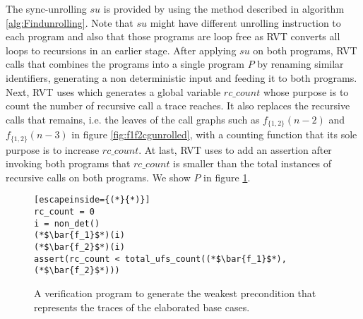 The sync-unrolling $su$ is provided by using the method described in algorithm \ref{alg:Findunrolling}. Note that $su$ might have different unrolling instruction to each program and also that those programs are loop free as RVT converts all loops to recursions in an earlier stage. After applying $su$ on both programs, RVT calls  that combines the programs into a single program $P$ by renaming similar identifiers, generating a non deterministic input and feeding it to both programs. Next, RVT uses  which generates a global variable $rc\_count$ whose purpose is to count the number of recursive call a trace reaches. It also replaces the recursive calls that remains, i.e. the leaves of the call graphs such as $f_{\{1,2\}}(n-2)$ and $f_{\{1,2\}}(n-3)$ in figure \ref{fig:f1f2cgunrolled}, with a counting function that its sole purpose is to increase $rc\_count$. At last, RVT uses   to add an assertion after invoking both programs that $rc\_count$ is smaller than the total instances of recursive calls on both programs. We show $P$ in figure \ref{fig:wp4basegap}.
\begin{figure} [h]
\begin{center}
\begin{minipage}{7 cm}
\begin{lstlisting}[escapeinside={(*}{*)}]
rc_count = 0
i = non_det()
(*$\bar{f_1}$*)(i)
(*$\bar{f_2}$*)(i)
assert(rc_count < total_ufs_count((*$\bar{f_1}$*),(*$\bar{f_2}$*)))
\end{lstlisting}
\end{minipage}
\caption{A verification program to generate the weakest precondition that represents the traces of the elaborated base cases.}
\label{fig:wp4basegap}
\end{center}
\end{figure}

